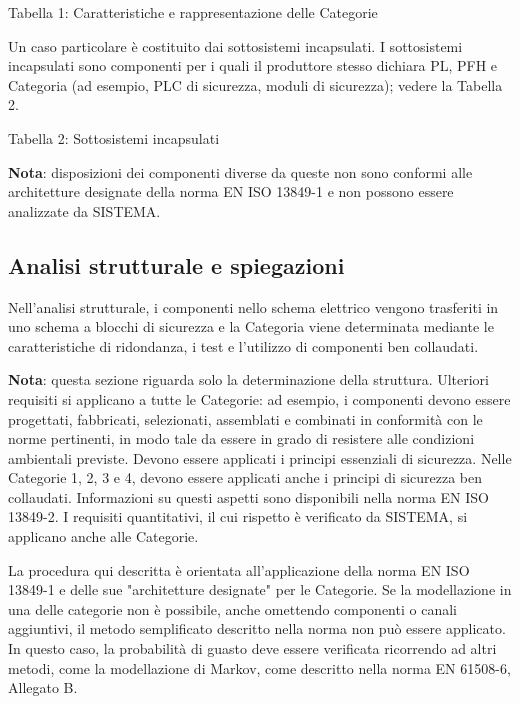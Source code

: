 \documentclass[a4paper,11pt]{article}
\begin{document}
    Tabella 1: Caratteristiche e rappresentazione delle Categorie
    
    \par\medskip\noindent Un caso particolare è costituito dai sottosistemi incapsulati. I sottosistemi incapsulati sono componenti per i quali il produttore stesso dichiara PL, PFH e Categoria (ad esempio, PLC di sicurezza, moduli di sicurezza); vedere la Tabella 2.

    Tabella 2: Sottosistemi incapsulati

    \par\medskip\noindent \textbf{Nota}: disposizioni dei componenti diverse da queste non sono conformi alle architetture designate della norma EN ISO 13849-1 e non possono essere analizzate da SISTEMA.

    \subsection{Analisi strutturale e spiegazioni}
    \par\medskip\noindent Nell'analisi strutturale, i componenti nello schema elettrico vengono trasferiti in uno schema a blocchi di sicurezza e la Categoria viene determinata mediante le caratteristiche di ridondanza, i test e l'utilizzo di componenti ben collaudati.
    
    \textbf{Nota}: questa sezione riguarda solo la determinazione della struttura. Ulteriori requisiti si applicano a tutte le Categorie: ad esempio, i componenti devono essere progettati, fabbricati, selezionati, assemblati e combinati in conformità con le norme pertinenti, in modo tale da essere in grado di resistere alle condizioni ambientali previste. Devono essere applicati i principi essenziali di sicurezza. Nelle Categorie 1, 2, 3 e 4, devono essere applicati anche i principi di sicurezza ben collaudati. Informazioni su questi aspetti sono disponibili nella norma EN ISO 13849-2. I requisiti quantitativi, il cui rispetto è verificato da SISTEMA, si applicano anche alle Categorie.
    
    \par\medskip\noindent La procedura qui descritta è orientata all'applicazione della norma EN ISO 13849-1 e delle sue "architetture designate" per le Categorie. Se la modellazione in una delle categorie non è possibile, anche omettendo componenti o canali aggiuntivi, il metodo semplificato descritto nella norma non può essere applicato. In questo caso, la probabilità di guasto deve essere verificata ricorrendo ad altri metodi, come la modellazione di Markov, come descritto nella norma EN 61508-6, Allegato B.
\end{document}
